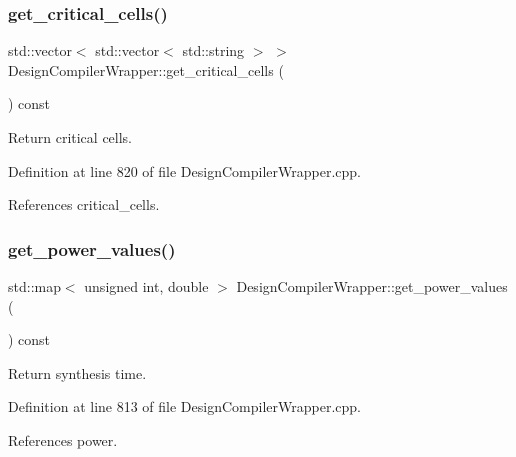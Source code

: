 \subsubsection{\texorpdfstring{get\+\_\+critical\+\_\+cells()}{get\_critical\_cells()}}
{\footnotesize\ttfamily std\+::vector$<$ std\+::vector$<$ std\+::string $>$ $>$ Design\+Compiler\+Wrapper\+::get\+\_\+critical\+\_\+cells (\begin{DoxyParamCaption}{ }\end{DoxyParamCaption}) const}



Return critical cells. 



Definition at line 820 of file Design\+Compiler\+Wrapper.\+cpp.



References critical\+\_\+cells.

\mbox{\label{classDesignCompilerWrapper_a9668d7b28281b9144face18e60271c07}} 
\subsubsection{\texorpdfstring{get\+\_\+power\+\_\+values()}{get\_power\_values()}}
{\footnotesize\ttfamily std\+::map$<$ unsigned int, double $>$ Design\+Compiler\+Wrapper\+::get\+\_\+power\+\_\+values (\begin{DoxyParamCaption}{ }\end{DoxyParamCaption}) const}



Return synthesis time. 



Definition at line 813 of file Design\+Compiler\+Wrapper.\+cpp.



References power.

\mbox{\label{classDesignCompilerWrapper_a6e7c15db8b5d495810902ee854289abf}} 
